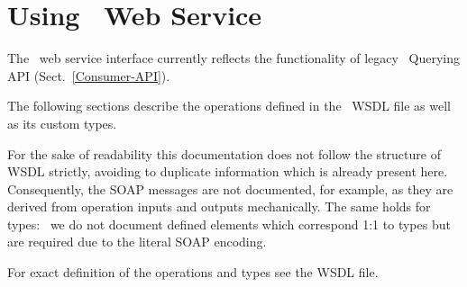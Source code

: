 %
%
%
%

\section{Using \LB\ Web Service}



The \LB\ web service interface currently reflects the functionality of legacy
\LB\ Querying API (Sect.~\ref{Consumer-API}).

The following sections describe the operations defined in the \LB\ WSDL
file as well as its custom types.

For the sake of readability this documentation does not follow the structure
of WSDL strictly, avoiding to duplicate information which is already present
here. Consequently, the SOAP messages are not documented, for example, as they
are derived from operation inputs and outputs mechanically.
The same holds for types: \eg\ we do not document defined elements
which correspond 1:1 to types but are required due to the literal SOAP
encoding.

For exact definition of the operations and types see the WSDL file.

